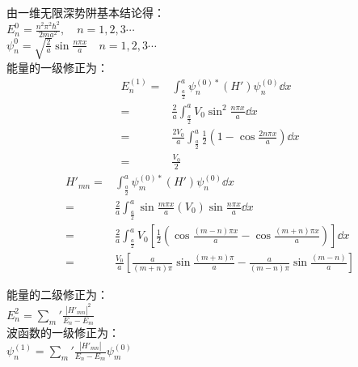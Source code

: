 \subsection{ }
由一维无限深势阱基本结论得：\\

$\displaystyle E^{0}_{n} = \frac{n^{2} \pi^{2} \hbar^{2}}{2ma^{2}},\quad n = 1,2,3\cdots $ \\

$\displaystyle \psi^{0}_{n} = \sqrt{\frac{2}{a}} \sin{\frac{n \pi x}{a}}\quad n = 1,2,3\cdots $ \\

能量的一级修正为：\\
\begin{equation}
\begin{aligned}
E^{(1)}_{n} =& \int^{a}_{\frac{a}{2}} \psi^{(0)*}_{n} (H') \psi^{(0)}_{n} \dd{x} \\
=& \frac{2}{a} \int^{a}_{\frac{a}{2}} V_{0} \sin^{2}{\frac{n \pi x}{a}} \dd{x} \\
=& \frac{2V_{0}}{a} \int^{a}_{\frac{a}{2}} \frac{1}{2} (1-\cos{\frac{2n \pi x}{a}}) \dd{x} \\
=& \frac{V_{0}}{2}
\end{aligned}
\end{equation}
\begin{equation}
\begin{aligned}
H'_{mn} =& \int^{a}_{\frac{a}{2}} \psi^{(0)*}_{m}(H') \psi^{(0)}_{n} \dd{x} \\
=& \frac{2}{a} \int^{a}_{\frac{a}{2}} \sin{\frac{m \pi x}{a}} (V_{0}) \sin{\frac{n \pi x}{a}} \dd{x} \\
=& \frac{2}{a} \int^{a}_{\frac{a}{2}} V_{0} \left[ \frac{1}{2} (\cos{\frac{(m-n) \pi x}{a}} - \cos{\frac{(m+n) \pi x}{a}}) \right] \dd{x} \\
=& \frac{V_{0}}{a} \left[ \frac{a}{(m+n)\pi} \sin{\frac{(m+n)\pi}{a}} - \frac{a}{(m-n)\pi} \sin{\frac{(m-n)}{a}} \right]
\end{aligned}
\end{equation}

能量的二级修正为：\\

$\displaystyle E^{2}_{n} = \sum_{m}' \frac{\left| H'_{mn} \right|^{2}}{E_{n} - E_{m}} $ \\

波函数的一级修正为：\\

$\displaystyle \psi^{(1)}_{n} = \sum_{m}' \frac{\left| H'_{mn} \right|}{E_{n} - E_{m}} \psi^{(0)}_{m} $ \\

